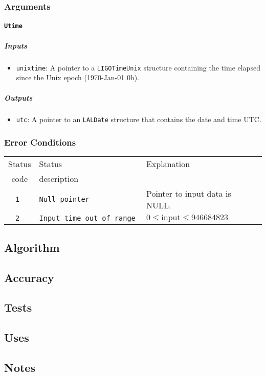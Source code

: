 \subsubsection{Arguments}

\paragraph{\texttt{Utime}}

\subparagraph{Inputs}

\begin{itemize}
    \item \texttt{unixtime}: A pointer to a \texttt{LIGOTimeUnix} structure
    containing the time elapsed since the Unix epoch (1970-Jan-01 0h).
\end{itemize}

\subparagraph{Outputs}

\begin{itemize}
    \item \texttt{utc}: A pointer to an \texttt{LALDate} structure that
    contains the date and time UTC.
\end{itemize}

\subsubsection{Error Conditions}
\begin{tabular}{|c|l|l|}
  \hline
  Status & Status       & Explanation \\
  code   & description  &             \\
  \hline
  \tt 1  & \tt Null pointer & Pointer to input data is NULL. \\
  \tt 2  & \tt Input time out of range & $0 \leqslant \textrm{input} \leqslant 946684823$ \\
  \hline
\end{tabular}

\subsection{Algorithm}


\subsection{Accuracy}

\subsection{Tests}

\subsection{Uses}


\subsection{Notes}
\label{sec:utimec:notes}



